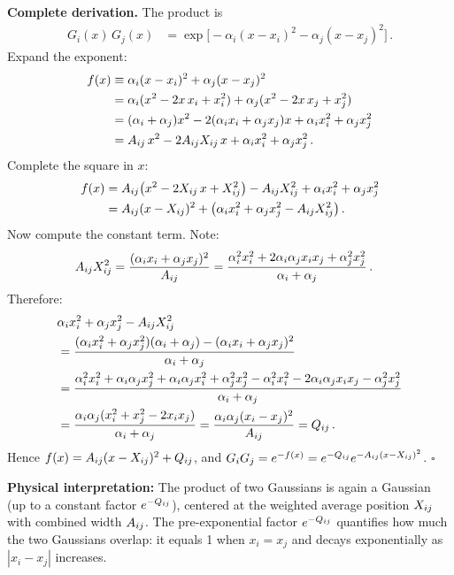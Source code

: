 \textbf{Complete derivation.} The product is
\begin{align}
  G_i(x)\,G_j(x) &= \exp\bigl[-\alpha_i(x-x_i)^2 - \alpha_j(x-x_j)^2\bigr]\,.
\end{align}
Expand the exponent:
\begin{align}
  f(x) &\equiv \alpha_i(x-x_i)^2 + \alpha_j(x-x_j)^2\notag\\
  &= \alpha_i(x^2 - 2x\,x_i + x_i^2) + \alpha_j(x^2 - 2x\,x_j + x_j^2)\notag\\
  &= (\alpha_i+\alpha_j)x^2 - 2(\alpha_i x_i + \alpha_j x_j)x + \alpha_i x_i^2 + \alpha_j x_j^2\notag\\
  &= A_{ij}\,x^2 - 2A_{ij}X_{ij}\,x + \alpha_i x_i^2 + \alpha_j x_j^2\,.
\end{align}
Complete the square in $x$:
\begin{align}
  f(x) &= A_{ij}\bigl(x^2 - 2X_{ij}\,x + X_{ij}^2\bigr) - A_{ij}X_{ij}^2 + \alpha_i x_i^2 + \alpha_j x_j^2\notag\\
  &= A_{ij}(x - X_{ij})^2 + \bigl(\alpha_i x_i^2 + \alpha_j x_j^2 - A_{ij}X_{ij}^2\bigr)\,.
\end{align}
Now compute the constant term. Note:
\begin{align}
  A_{ij}X_{ij}^2 &= \frac{(\alpha_i x_i + \alpha_j x_j)^2}{A_{ij}}
  = \frac{\alpha_i^2 x_i^2 + 2\alpha_i\alpha_j x_i x_j + \alpha_j^2 x_j^2}{\alpha_i+\alpha_j}\,.
\end{align}
Therefore:
\begin{align}
  &\alpha_i x_i^2 + \alpha_j x_j^2 - A_{ij}X_{ij}^2\notag\\
  &= \frac{(\alpha_i x_i^2 + \alpha_j x_j^2)(\alpha_i+\alpha_j) - (\alpha_i x_i + \alpha_j x_j)^2}{\alpha_i+\alpha_j}\notag\\
  &= \frac{\alpha_i^2 x_i^2 + \alpha_i\alpha_j x_j^2 + \alpha_i\alpha_j x_i^2 + \alpha_j^2 x_j^2
       - \alpha_i^2 x_i^2 - 2\alpha_i\alpha_j x_i x_j - \alpha_j^2 x_j^2}{\alpha_i+\alpha_j}\notag\\
  &= \frac{\alpha_i\alpha_j(x_i^2 + x_j^2 - 2x_i x_j)}{\alpha_i+\alpha_j}
  = \frac{\alpha_i\alpha_j(x_i-x_j)^2}{A_{ij}} = Q_{ij}\,.
\end{align}
Hence $f(x) = A_{ij}(x-X_{ij})^2 + Q_{ij}$, and $G_i G_j = e^{-f(x)} = e^{-Q_{ij}}e^{-A_{ij}(x-X_{ij})^2}$. $\square$

\textbf{Physical interpretation:} The product of two Gaussians is again a Gaussian (up to a
constant factor $e^{-Q_{ij}}$), centered at the weighted average position $X_{ij}$ with combined
width $A_{ij}$. The pre-exponential factor $e^{-Q_{ij}}$ quantifies how much the two Gaussians
overlap: it equals 1 when $x_i = x_j$ and decays exponentially as $|x_i - x_j|$ increases.

